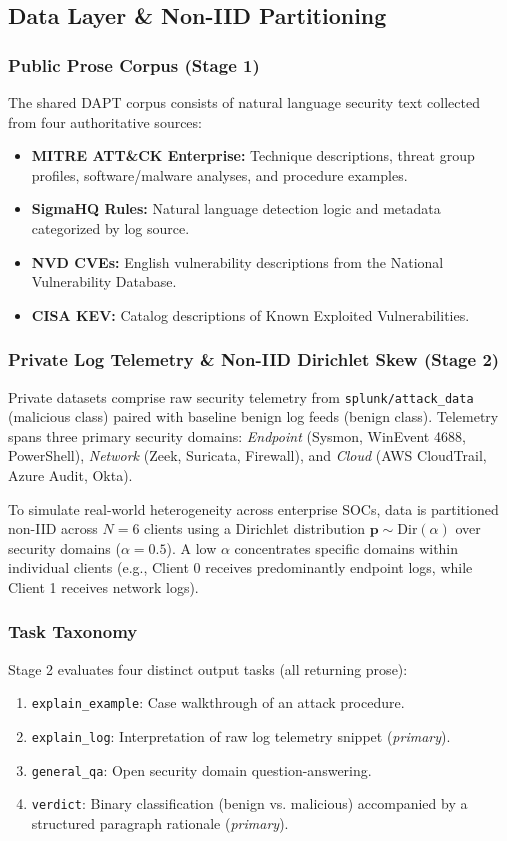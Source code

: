 \documentclass[11pt,a4paper]{article}
\begin{document}
\subsection{Data Layer \& Non-IID Partitioning}

\subsubsection{Public Prose Corpus (Stage 1)}
The shared DAPT corpus consists of natural language security text collected from four authoritative sources:
\begin{itemize}
    \item \textbf{MITRE ATT\&CK Enterprise:} Technique descriptions, threat group profiles, software/malware analyses, and procedure examples.
    \item \textbf{SigmaHQ Rules:} Natural language detection logic and metadata categorized by log source.
    \item \textbf{NVD CVEs:} English vulnerability descriptions from the National Vulnerability Database.
    \item \textbf{CISA KEV:} Catalog descriptions of Known Exploited Vulnerabilities.
\end{itemize}

\subsubsection{Private Log Telemetry \& Non-IID Dirichlet Skew (Stage 2)}
Private datasets comprise raw security telemetry from \texttt{splunk/attack\_data} (malicious class) paired with baseline benign log feeds (benign class). Telemetry spans three primary security domains: \emph{Endpoint} (Sysmon, WinEvent 4688, PowerShell), \emph{Network} (Zeek, Suricata, Firewall), and \emph{Cloud} (AWS CloudTrail, Azure Audit, Okta).

To simulate real-world heterogeneity across enterprise SOCs, data is partitioned non-IID across $N=6$ clients using a Dirichlet distribution $\boldsymbol{p} \sim \text{Dir}(\alpha)$ over security domains ($\alpha = 0.5$). A low $\alpha$ concentrates specific domains within individual clients (e.g., Client 0 receives predominantly endpoint logs, while Client 1 receives network logs).

\subsubsection{Task Taxonomy}
Stage 2 evaluates four distinct output tasks (all returning prose):
\begin{enumerate}
    \item \texttt{explain\_example}: Case walkthrough of an attack procedure.
    \item \texttt{explain\_log}: Interpretation of raw log telemetry snippet (\emph{primary}).
    \item \texttt{general\_qa}: Open security domain question-answering.
    \item \texttt{verdict}: Binary classification (benign vs. malicious) accompanied by a structured paragraph rationale (\emph{primary}).
\end{enumerate}
\end{document}
